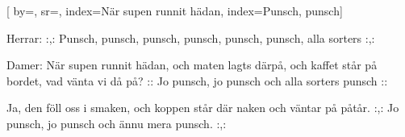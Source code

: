 

[ 		%
	by={},					%
	sr={},					%
	index={När supen runnit hädan}, %
	index={Punsch, punsch}]						%
	

\beginverse*						%
Herrar:
:,: Punsch, punsch,
punsch, punsch,
punsch, punsch,
alla sorters :,:
\endverse							%

\beginverse*						%
Damer:
När supen runnit hädan,
och maten lagts därpå,
och kaffet står på bordet,
vad vänta vi då på?
:: Jo punsch, jo punsch
och alla sorters punsch ::
\endverse							%

\beginverse*						%
Ja, den föll oss i smaken,
och koppen står där naken
och väntar på påtår.
:,: Jo punsch, jo punsch
och ännu mera punsch. :,:
\endverse


\endsong							%